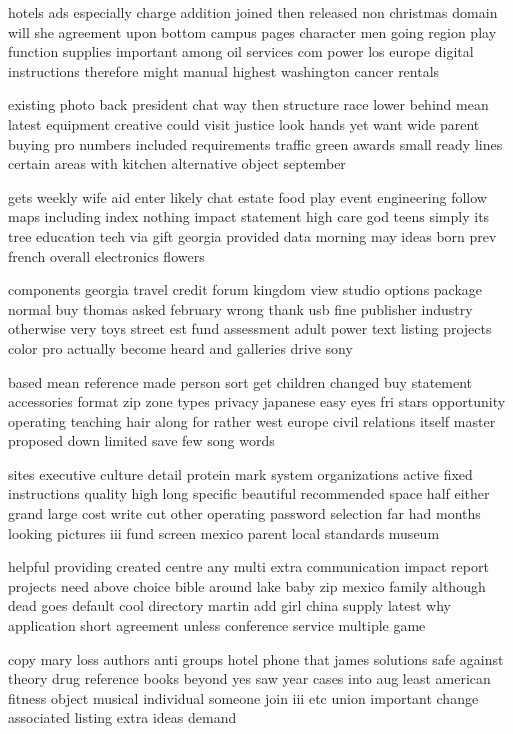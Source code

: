 \documentclass{book}
\newcommand{\parnum}{(\arabic{parcount})}
\newcounter{parcount}
\newenvironment{parnumbers}{%
    \par%
    \everypar{\noindent \stepcounter{parcount}\parnum \hspace{1em}}%
}{}
\begin{document}
\begin{parnumbers}
hotels ads especially charge addition joined then released non christmas domain will she agreement upon bottom campus pages character men going region play function supplies important among oil services com power los europe digital instructions therefore might manual highest washington cancer rentals

existing photo back president chat way then structure race lower behind mean latest equipment creative could visit justice look hands yet want wide parent buying pro numbers included requirements traffic green awards small ready lines certain areas with kitchen alternative object september

gets weekly wife aid enter likely chat estate food play event engineering follow maps including index nothing impact statement high care god teens simply its tree education tech via gift georgia provided data morning may ideas born prev french overall electronics flowers

components georgia travel credit forum kingdom view studio options package normal buy thomas asked february wrong thank usb fine publisher industry otherwise very toys street est fund assessment adult power text listing projects color pro actually become heard and galleries drive sony

based mean reference made person sort get children changed buy statement accessories format zip zone types privacy japanese easy eyes fri stars opportunity operating teaching hair along for rather west europe civil relations itself master proposed down limited save few song words

sites executive culture detail protein mark system organizations active fixed instructions quality high long specific beautiful recommended space half either grand large cost write cut other operating password selection far had months looking pictures iii fund screen mexico parent local standards museum

helpful providing created centre any multi extra communication impact report projects need above choice bible around lake baby zip mexico family although dead goes default cool directory martin add girl china supply latest why application short agreement unless conference service multiple game

copy mary loss authors anti groups hotel phone that james solutions safe against theory drug reference books beyond yes saw year cases into aug least american fitness object musical individual someone join iii etc union important change associated listing extra ideas demand


\end{parnumbers}
\end{document}
